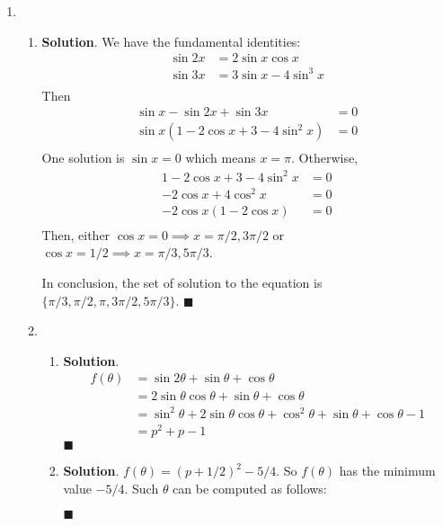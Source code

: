 \documentclass[12pt]{article}
\newenvironment*{sol}{\par \textbf{Solution}.}{\hfill$\blacksquare$}
\begin{document}
\begin{enumerate}
\begin{sol}
\begin{align*}
            \end{align*}
            If $2a=-3b$, we have \begin{align*}
                -12b+9b+6&=0\\
                b=-2 &,a=3
            \end{align*}
            Then $a=-\dfrac{3}{7}$ or $a=3$.
        \end{sol}
        \item \begin{enumerate}
            \item \begin{sol}
                We have the fundamental identities:\begin{align*}
                    \sin{2x}&=2\sin{x}\cos{x}\\
                    \sin{3x}&=3\sin{x}-4\sin^3{x}\\
                \end{align*}
                Then \begin{align*}
                    \sin{x}-\sin{2x}+\sin{3x}&=0\\
                    \sin{x}(1-2\cos{x}+3-4\sin^2{x})&=0\\
                \end{align*}
                One solution is $\sin{x}=0$ which means $x=\pi$. Otherwise,\begin{align*}
                    1-2\cos{x}+3-4\sin^2{x}&=0\\
                    -2\cos{x}+4\cos^2{x}&=0\\
                    -2\cos{x}(1-2\cos{x})&=0\\
                \end{align*}
                Then, either $\cos{x}=0\implies x=\pi/2,3\pi/2$ or $\cos{x}=1/2\implies x=\pi/3,5\pi/3$.

                In conclusion, the set of solution to the equation is $\{\pi/3,\pi/2,\pi,3\pi/2,5\pi/3\}$.
            \end{sol}
            \item \begin{enumerate}
                \item \begin{sol}
                    \begin{align*}
                        f(\theta)&=\sin{2\theta}+\sin{\theta}+\cos{\theta}\\
                        &=2\sin{\theta}\cos{\theta}+\sin{\theta}+\cos{\theta}\\
                        &=\sin^2{\theta}+2\sin{\theta}\cos{\theta}+\cos^2{\theta}+\sin{\theta}+\cos{\theta}-1\\
                        &=p^2+p-1
                    \end{align*}
                \end{sol}
                \item \begin{sol}
                    $f(\theta)=(p+1/2)^2-5/4$. So $f(\theta)$ has the minimum value $-5/4$. Such $\theta$ can be computed as follows:
                    

\end{sol}
\end{enumerate}
\end{enumerate}
\end{enumerate}
\end{document}
